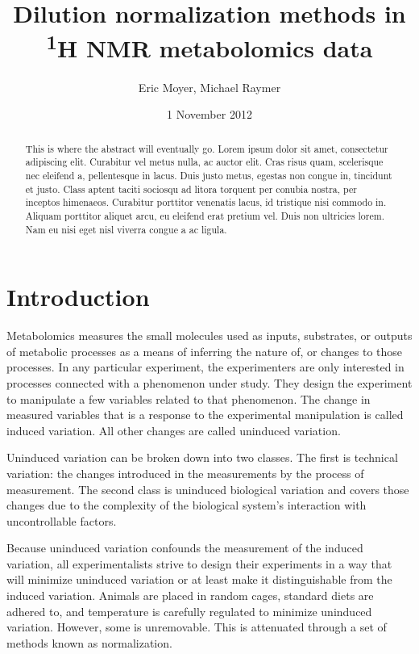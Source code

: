 \documentclass[english]{article}
\begin{document}
\title{Dilution normalization methods in \textsuperscript{1}H NMR metabolomics data}

\author{Eric Moyer, Michael Raymer}

\date{1 November 2012}

\maketitle

\begin{abstract}
This is where the abstract will eventually go. Lorem ipsum dolor sit amet, consectetur adipiscing elit. Curabitur vel metus nulla, ac auctor elit. Cras risus quam, scelerisque nec eleifend a, pellentesque in lacus. Duis justo metus, egestas non congue in, tincidunt et justo. Class aptent taciti sociosqu ad litora torquent per conubia nostra, per inceptos himenaeos. Curabitur porttitor venenatis lacus, id tristique nisi commodo in. Aliquam porttitor aliquet arcu, eu eleifend erat pretium vel. Duis non ultricies lorem. Nam eu nisi eget nisl viverra congue a ac ligula.
\end{abstract}

\section{Introduction}
Metabolomics measures the small molecules used as inputs, substrates, or outputs of metabolic processes as a means of inferring the nature of, or changes to those processes. In any particular experiment, the experimenters are only interested in processes connected with a phenomenon under study. They design the experiment to manipulate a few variables related to that phenomenon. The change in measured variables that is a response to the experimental manipulation is called induced variation. All other changes are called uninduced variation.

Uninduced variation can be broken down into two classes. The first is technical variation: the changes introduced in the measurements by the process of measurement. The second class is uninduced biological variation and covers those changes due to the complexity of the biological system's interaction with uncontrollable factors.

Because uninduced variation confounds the measurement of the induced variation, all experimentalists strive to design their experiments in a way that will minimize uninduced variation or at least make it distinguishable from the induced variation. Animals are placed in random cages, standard diets are adhered to, and temperature is carefully regulated to minimize uninduced variation. However, some is unremovable. This is attenuated through a set of methods known as normalization.
\end{document}
